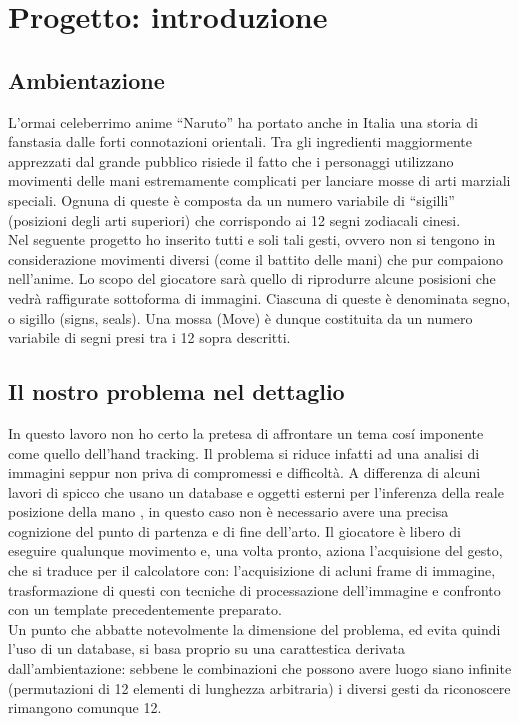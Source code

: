 \documentclass[a4paper,10pt, twocolumn]{article}
\begin{document}
\section{Progetto: introduzione}
  \subsection{Ambientazione}
  L'ormai celeberrimo anime ``Naruto'' ha portato anche in Italia una storia di fanstasia
  dalle forti connotazioni orientali. Tra gli ingredienti maggiormente apprezzati dal
  grande pubblico risiede il fatto che i personaggi utilizzano movimenti 
  delle mani estremamente complicati per lanciare mosse di arti marziali speciali.
  Ognuna di queste \`{e} composta da un numero variabile di ``sigilli'' (posizioni degli arti
  superiori) che corrispondo ai 12 segni zodiacali cinesi.\\
  Nel seguente progetto ho inserito tutti e soli tali gesti, ovvero non si tengono in considerazione
  movimenti diversi (come il battito delle mani) che pur compaiono nell'anime.
  Lo scopo del giocatore sar\`{a} quello di riprodurre
  alcune posisioni che vedr\`{a} raffigurate sottoforma di immagini. Ciascuna
  di queste \`{e} denominata segno, o sigillo (signs, seals). Una mossa (Move) \`{e} dunque
  costituita da un numero variabile di segni presi tra i 12 sopra descritti.
  
  \subsection{Il nostro problema nel dettaglio}
  In questo lavoro non ho certo la pretesa di affrontare un tema cos\'{i} imponente come 
  quello dell'hand tracking. Il problema si riduce infatti ad una analisi di immagini
  seppur non priva di compromessi e difficolt\`{a}. A differenza di alcuni lavori
  di spicco che usano un database e oggetti esterni
  per l'inferenza della reale posizione della mano \cite{mitGlove}, in questo caso non
  \`{e} necessario avere una precisa cognizione del punto di partenza e di 
  fine dell'arto.
  Il giocatore \`{e} libero di eseguire qualunque movimento e, una volta pronto,
  aziona l'acquisione del gesto, che si traduce per il calcolatore con: l'acquisizione 
  di acluni frame di immagine, trasformazione di questi con tecniche di processazione
  dell'immagine e confronto con un template precedentemente preparato.\\
  Un punto che abbatte notevolmente la dimensione del problema, ed evita quindi l'uso 
  di un database, si basa proprio su una carattestica derivata dall'ambientazione:
  sebbene le combinazioni che possono avere luogo siano infinite (permutazioni di 12 
  elementi di lunghezza arbitraria) i diversi gesti da riconoscere rimangono comunque 12.
  
\end{document}
